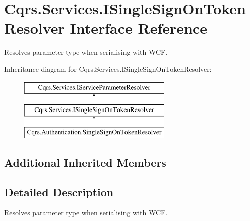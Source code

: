 \hypertarget{interfaceCqrs_1_1Services_1_1ISingleSignOnTokenResolver}{}\section{Cqrs.\+Services.\+I\+Single\+Sign\+On\+Token\+Resolver Interface Reference}
\label{interfaceCqrs_1_1Services_1_1ISingleSignOnTokenResolver}


Resolves parameter type when serialising with W\+CF.  


Inheritance diagram for Cqrs.\+Services.\+I\+Single\+Sign\+On\+Token\+Resolver\+:\begin{figure}[H]
\begin{center}
\leavevmode
\includegraphics[height=3.000000cm]{interfaceCqrs_1_1Services_1_1ISingleSignOnTokenResolver}
\end{center}
\end{figure}
\subsection*{Additional Inherited Members}


\subsection{Detailed Description}
Resolves parameter type when serialising with W\+CF. 

